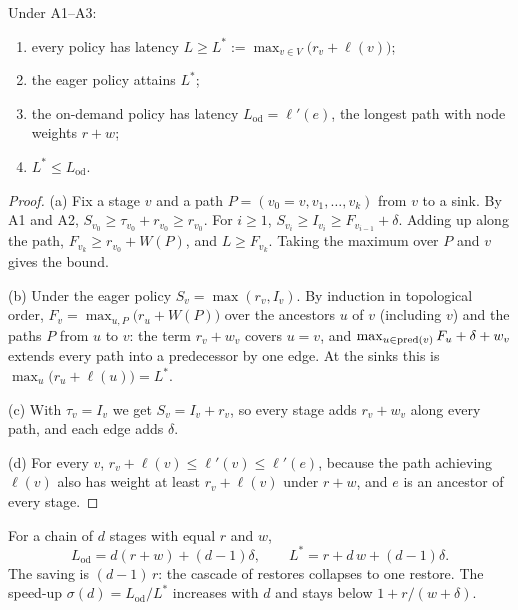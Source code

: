 \begin{theorem}
\label{thm:lb}
Under A1--A3:
\begin{enumerate}[label=(\alph*)]
  \item every policy has latency $L \ge L^* := \max_{v \in V} \bigl(r_v + \ell(v)\bigr)$;
  \item the eager policy attains $L^*$;
  \item the on-demand policy has latency $L_{\mathrm{od}} = \ell'(e)$, the longest path with
        node weights $r + w$;
  \item $L^* \le L_{\mathrm{od}}$.
\end{enumerate}
\end{theorem}

\begin{proof}
(a) Fix a stage $v$ and a path $P = (v_0 = v, v_1, \dots, v_k)$ from $v$ to a sink. By A1 and
A2, $S_{v_0} \ge \tau_{v_0} + r_{v_0} \ge r_{v_0}$. For $i \ge 1$,
$S_{v_i} \ge I_{v_i} \ge F_{v_{i-1}} + \delta$. Adding up along the path,
$F_{v_k} \ge r_{v_0} + W(P)$, and $L \ge F_{v_k}$. Taking the maximum over $P$ and $v$ gives
the bound.

(b) Under the eager policy $S_v = \max(r_v, I_v)$. By induction in topological order,
$F_v = \max_{u, P} \bigl(r_u + W(P)\bigr)$ over the ancestors $u$ of $v$ (including $v$) and the
paths $P$ from $u$ to $v$: the term $r_v + w_v$ covers $u = v$, and
$\max_{u \in \operatorname{pred}(v)} F_u + \delta + w_v$ extends every path into a predecessor by one edge.
At the sinks this is $\max_u \bigl(r_u + \ell(u)\bigr) = L^*$.

(c) With $\tau_v = I_v$ we get $S_v = I_v + r_v$, so every stage adds $r_v + w_v$ along every
path, and each edge adds $\delta$.

(d) For every $v$, $r_v + \ell(v) \le \ell'(v) \le \ell'(e)$, because the path achieving
$\ell(v)$ also has weight at least $r_v + \ell(v)$ under $r + w$, and $e$ is an ancestor of
every stage.
\end{proof}

\begin{corollary}[Chains]
\label{cor:chain}
For a chain of $d$ stages with equal $r$ and $w$,
\[
  L_{\mathrm{od}} = d(r + w) + (d - 1)\delta, \qquad L^* = r + d\,w + (d - 1)\delta .
\]
The saving is $(d - 1)\,r$: the cascade of restores collapses to one restore. The speed-up
$\sigma(d) = L_{\mathrm{od}} / L^*$ increases with $d$ and stays below $1 + r/(w + \delta)$.
\end{corollary}

